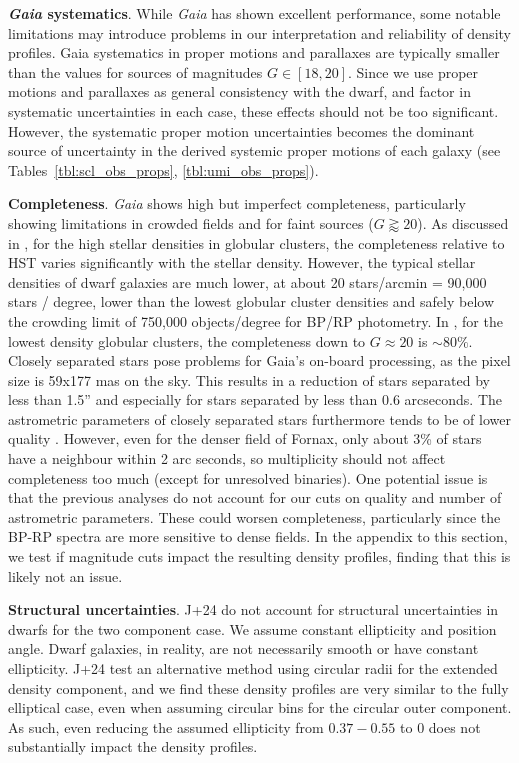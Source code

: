 \textbf{\emph{Gaia} systematics}. While \emph{Gaia} has shown excellent
performance, some notable limitations may introduce problems in our
interpretation and reliability of density profiles. Gaia systematics in
proper motions and parallaxes are typically smaller than the values for
sources of magnitudes \(G\in[18,20]\). Since we use proper motions and
parallaxes as general consistency with the dwarf, and factor in
systematic uncertainties in each case, these effects should not be too
significant. However, the systematic proper motion uncertainties becomes
the dominant source of uncertainty in the derived systemic proper
motions of each galaxy (see
Tables~\ref{tbl:scl_obs_props}, \ref{tbl:umi_obs_props}).

\textbf{Completeness}. \emph{Gaia} shows high but imperfect
completeness, particularly showing limitations in crowded fields and for
faint sources (\(G\gtrapprox20\)). As discussed in
\citet{fabricius+2021}, for the high stellar densities in globular
clusters, the completeness relative to HST varies significantly with the
stellar density. However, the typical stellar densities of dwarf
galaxies are much lower, at about 20 stars/arcmin = 90,000 stars /
degree, lower than the lowest globular cluster densities and safely
below the crowding limit of 750,000 objects/degree for BP/RP photometry.
In \citet{fabricius+2021}, for the lowest density globular clusters, the
completeness down to \(G\approx 20\) is \(\sim 80\%\). Closely separated
stars pose problems for Gaia's on-board processing, as the pixel size is
59x177 mas on the sky. This results in a reduction of stars separated by
less than 1.5'' and especially for stars separated by less than 0.6
arcseconds. The astrometric parameters of closely separated stars
furthermore tends to be of lower quality \citep{fabricius+2021}.
However, even for the denser field of Fornax, only about 3\% of stars
have a neighbour within 2 arc seconds, so multiplicity should not affect
completeness too much (except for unresolved binaries). One potential
issue is that the previous analyses do not account for our cuts on
quality and number of astrometric parameters. These could worsen
completeness, particularly since the BP-RP spectra are more sensitive to
dense fields. In the appendix to this section, we test if magnitude cuts
impact the resulting density profiles, finding that this is likely not
an issue.

\textbf{Structural uncertainties}. J+24 do not account for structural
uncertainties in dwarfs for the two component case. We assume constant
ellipticity and position angle. Dwarf galaxies, in reality, are not
necessarily smooth or have constant ellipticity. J+24 test an
alternative method using circular radii for the extended density
component, and we find these density profiles are very similar to the
fully elliptical case, even when assuming circular bins for the circular
outer component. As such, even reducing the assumed ellipticity from
\(0.37-0.55\) to 0 does not substantially impact the density profiles.

